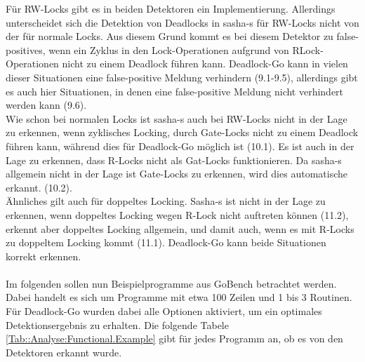 Für RW-Locks gibt es in beiden Detektoren ein Implementierung. Allerdings unterscheidet
sich die Detektion von Deadlocks in sasha-s für RW-Locks nicht von der für 
normale Locks. Aus diesem Grund kommt es bei diesem Detektor zu false-positives,
wenn ein Zyklus in den Lock-Operationen aufgrund von RLock-Operationen nicht 
zu einem Deadlock führen kann. Deadlock-Go kann in vielen dieser Situationen 
eine false-positive Meldung verhindern (9.1-9.5), allerdings gibt es auch hier 
Situationen, in denen eine false-positive Meldung nicht verhindert werden kann (9.6).\\
Wie schon bei normalen Locks ist sasha-s auch bei RW-Locks nicht in der Lage 
zu erkennen, wenn zyklisches Locking, durch Gate-Locks nicht zu einem Deadlock 
führen kann, während dies für Deadlock-Go möglich ist (10.1). Es ist auch in der Lage 
zu erkennen, dass R-Locks nicht als Gat-Locks funktionieren. Da sasha-s allgemein 
nicht in der Lage ist Gate-Locks zu erkennen, wird dies automatische erkannt. (10.2).\\
Ähnliches gilt auch für doppeltes Locking. Sasha-s ist 
nicht in der Lage zu erkennen, wenn doppeltes Locking wegen R-Lock nicht auftreten 
können (11.2), erkennt aber doppeltes Locking allgemein, und damit auch, wenn 
es mit R-Locks zu doppeltem Locking kommt (11.1). Deadlock-Go kann beide Situationen
korrekt erkennen.
\\\\
Im folgenden sollen nun Beispielprogramme aus GoBench \cite{gobench}
betrachtet werden. Dabei handelt es sich um Programme mit etwa 100 Zeilen und 
1 bis 3 Routinen. Für Deadlock-Go wurden dabei alle Optionen aktiviert, um ein 
optimales Detektionsergebnis zu erhalten.
Die folgende Tabele \ref{Tab::Analyse:Functional.Example} gibt für jedes Programm an,
 ob es von den Detektoren erkannt wurde.
